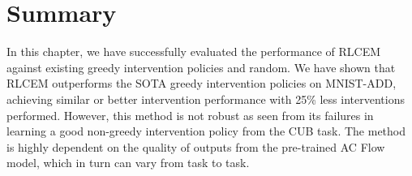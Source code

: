 \section{Summary}
In this chapter, we have successfully evaluated the performance
of RLCEM against existing greedy intervention policies 
and random.
We have shown that RLCEM outperforms the SOTA 
greedy intervention
policies on MNIST-ADD, achieving similar or better
intervention performance with 25\% less interventions performed.
However, this method is not robust as seen from its
failures in learning a good non-greedy intervention policy from the 
CUB task. The method is highly dependent on the quality of 
outputs from the pre-trained AC Flow model, which in turn can
vary
from task to task.
